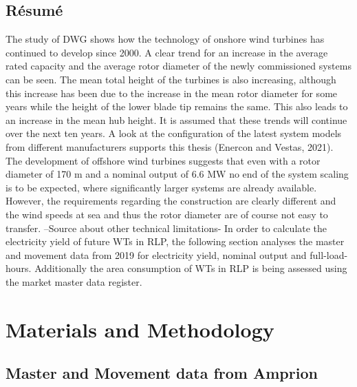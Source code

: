\documentclass[a4paper,11pt]{article}
\begin{document}
\hypertarget{ruxe9sumuxe9}{%
\subsection{Résumé}\label{ruxe9sumuxe9}}

The study of DWG shows how the technology of onshore wind turbines has continued to develop since 2000. A clear trend for an increase in the average rated capacity and the average rotor diameter of the newly commissioned systems can be seen. The mean total height of the turbines is also increasing, although this increase has been due to the increase in the mean rotor diameter for some years while the height of the lower blade tip remains the same. This also leads to an increase in the mean hub height. It is assumed that these trends will continue over the next ten years. A look at the configuration of the latest system models from different manufacturers supports this thesis (Enercon and Vestas, 2021). The development of offshore wind turbines suggests that even with a rotor diameter of 170 m and a nominal output of 6.6 MW no end of the system scaling is to be expected, where significantly larger systems are already available. However, the requirements regarding the construction are clearly different and the wind speeds at sea and thus the rotor diameter are of course not easy to transfer. --Source about other technical limitations-
In order to calculate the electricity yield of future WTs in RLP, the following section analyses the master and movement data from 2019 for electricity yield, nominal output and full-load-hours. Additionally the area consumption of WTs in RLP is being assessed using the market master data register.

\newpage

\hypertarget{materials-and-methodology}{%
\section{Materials and Methodology}\label{materials-and-methodology}}

\hypertarget{master-and-movement-data-from-amprion}{%
\subsection{Master and Movement data from Amprion}\label{master-and-movement-data-from-amprion}}
\end{document}
